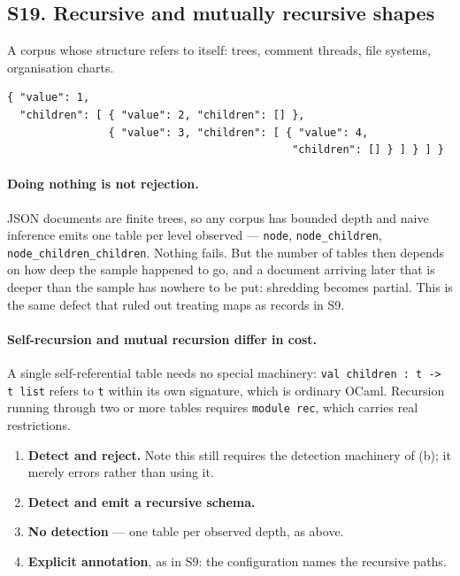 \subsection*{S19. Recursive and mutually recursive shapes}

A corpus whose structure refers to itself: trees, comment threads, file
systems, organisation charts.

\begin{lstlisting}[style=json]
{ "value": 1,
  "children": [ { "value": 2, "children": [] },
                { "value": 3, "children": [ { "value": 4,
                                             "children": [] } ] } ] }
\end{lstlisting}

\paragraph{Doing nothing is not rejection.}
JSON documents are finite trees, so any corpus has bounded depth and naive
inference emits one table per level observed --- \texttt{node},
\texttt{node\_children}, \texttt{node\_children\_children}. Nothing fails. But
the number of tables then depends on how deep the sample happened to go, and a
document arriving later that is deeper than the sample has nowhere to be put:
shredding becomes partial. This is the same defect that ruled out treating
maps as records in S9.

\paragraph{Self-recursion and mutual recursion differ in cost.}
A single self-referential table needs no special machinery: \texttt{val
children : t -> t list} refers to \texttt{t} within its own signature, which is
ordinary OCaml. Recursion running through two or more tables requires
\texttt{module rec}, which carries real restrictions.

\options
\begin{enumerate}[label=\textbf{(\alph*)}]
  \item \textbf{Detect and reject.} Note this still requires the detection
        machinery of (b); it merely errors rather than using it.
  \item \textbf{Detect and emit a recursive schema.}
  \item \textbf{No detection} --- one table per observed depth, as above.
  \item \textbf{Explicit annotation}, as in S9: the configuration names the
        recursive paths. \selected
\end{enumerate}

